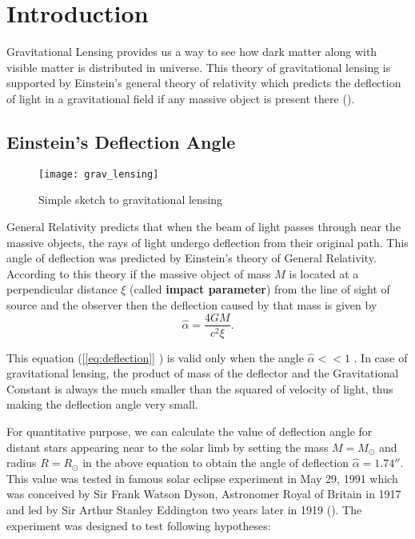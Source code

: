 \section{Introduction}\label{sec:intro}
Gravitational Lensing provides us a way to see how dark matter along with 
visible matter is distributed in universe. This theory of gravitational lensing is supported by Einstein's general theory of relativity which predicts the deflection of light in a gravitational field if any massive object is present there (\cite{hartle03}).
%
%
%
\subsection{Einstein's Deflection Angle}
  \begin{figure}[ht!]
      \centering
      \texttt{[image: grav\_lensing]}
      \caption[Simple sketch to gravitational lensing.] {Simple sketch to gravitational lensing ~\protect\cite{barSch_01}} %
      \label{[fig:lensing] }%
  \end{figure} %
  

  General Relativity predicts that when the beam of light passes through near
  the massive objects, the rays of light undergo deflection from their original path.
  This angle of deflection was predicted by Einstein's theory of General Relativity.
  According to this theory if the massive object of mass $M$ is located at a
  perpendicular distance $\xi$ (called \textbf{impact parameter}) from the line of sight
  of source and the observer then the deflection caused by that mass is given by
  \cite{sch07}
  \begin{equation}
    \hat{\alpha} = \frac{4GM}{c^2\xi}.
    \label{[eq:deflection]}
  \end{equation}

  This equation (\ref{[eq:deflection]} ) is valid only when the angle
  $\hat{\alpha} <<1  $ . In  case of gravitational lensing, the product of mass of the
  deflector and the Gravitational Constant is always the much smaller than the
  squared of velocity of light, thus making the deflection angle very small.

  For quantitative purpose,
  we can calculate the value of deflection angle for distant stars appearing near to the
  solar limb by setting the mass $M = M_{\odot}$ and radius $ R = R_{\odot}$ in the above equation to obtain the angle of deflection $\hat{\alpha} = 1.74''$. This value was tested
  in famous solar eclipse experiment in May 29, 1991 which was conceived by Sir Frank Watson Dyson, Astronomer Royal of Britain in 1917 and led by Sir Arthur Stanley Eddington
  two years later in 1919 (\cite{eclipse19}). The experiment was designed to test following hypotheses:



